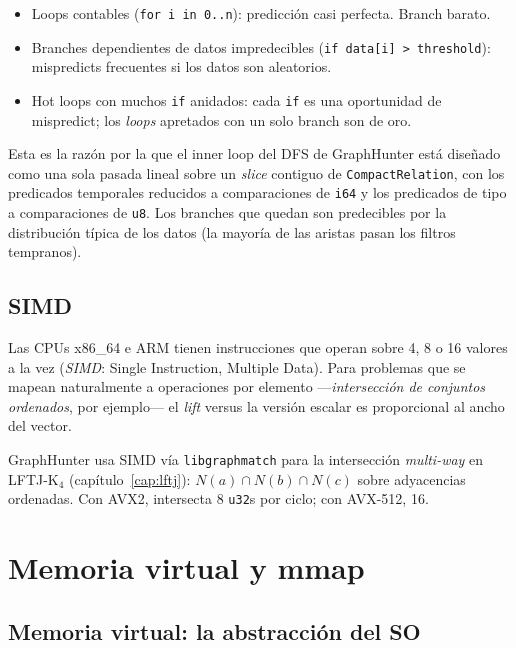 \begin{itemize}
    \item Loops contables (\texttt{for i in 0..n}): predicción casi
    perfecta. Branch barato.
    \item Branches dependientes de datos
    impredecibles (\texttt{if data[i] > threshold}): mispredicts
    frecuentes si los datos son aleatorios.
    \item Hot loops con muchos \texttt{if} anidados: cada
    \texttt{if} es una oportunidad de mispredict; los \emph{loops}
    apretados con un solo branch son de oro.
\end{itemize}

\begin{nota}
Esta es la razón por la que el inner loop del DFS de GraphHunter está
diseñado como una sola pasada lineal sobre un \emph{slice} contiguo
de \texttt{CompactRelation}, con los predicados temporales reducidos
a comparaciones de \texttt{i64} y los predicados de tipo a
comparaciones de \texttt{u8}. Los branches que quedan son
predecibles por la distribución típica de los datos (la mayoría de
las aristas pasan los filtros tempranos).
\end{nota}

\subsection{SIMD}

Las CPUs x86\_64 e ARM tienen instrucciones que operan sobre 4, 8 o
16 valores a la vez (\emph{SIMD}: Single Instruction, Multiple Data).
Para problemas que se mapean naturalmente a operaciones por elemento
---\emph{intersección de conjuntos ordenados}, por ejemplo--- el
\emph{lift} versus la versión escalar es proporcional al ancho del
vector.

GraphHunter usa SIMD vía \texttt{libgraphmatch} para la
intersección \emph{multi-way} en LFTJ-K\(_4\)
(capítulo~\ref{cap:lftj}): \(N(a) \cap N(b) \cap N(c)\) sobre
adyacencias ordenadas. Con AVX2, intersecta 8 \texttt{u32}s por
ciclo; con AVX-512, 16.

\section{Memoria virtual y mmap}

\subsection{Memoria virtual: la abstracción del SO}

